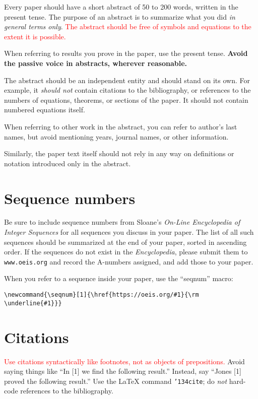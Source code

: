 \documentclass[12pt]{article}
\begin{document}
Every paper should have a short abstract of 50 to 200 words, written
in the present tense.  The purpose of an abstract is to summarize what
you did {\it in general terms only}.  
\textcolor{red}{The abstract
should be free of
symbols and equations to the extent it is possible.}

When referring to results you prove in the paper, use the present tense.  
\textbf{Avoid the passive voice in abstracts, wherever reasonable.}

The abstract should be an independent entity and should stand on its
own.  For example, it {\it should not\/} contain citations to the
bibliography, or references to the numbers of equations, theorems, or
sections of the paper.  It should not contain numbered equations
itself.   

When referring to other work in the abstract, you can refer to author's
last names, but avoid mentioning years, journal names, or other
information.

Similarly, the paper text itself should not rely in any way on definitions
or notation introduced only in the abstract.

\section{Sequence numbers}

Be sure to include sequence numbers from Sloane's {\it On-Line Encyclopedia
of Integer Sequences} for all sequences you discuss in your paper.
The list of all such sequences should be summarized at the end of your
paper, sorted in ascending order.    If the sequences do not exist in the
{\it Encyclopedia}, please submit them to {\tt www.oeis.org}
and record the A-numbers assigned,
and add those to your paper.

When you refer to a sequence inside your paper, use the ``seqnum'' macro:
\begin{verbatim}
\newcommand{\seqnum}[1]{\href{https://oeis.org/#1}{\rm \underline{#1}}}
\end{verbatim}


\section{Citations}

     \textcolor{red}{Use citations syntactically like footnotes,
not as objects of prepositions.}
Avoid saying things like ``In [1] we find the following result.''  Instead,
say ``Jones [1] proved the following result.''  Use the LaTeX command
{\tt \char'134cite}; do {\it not\/} hard-code references to the bibliography.
\end{document}

